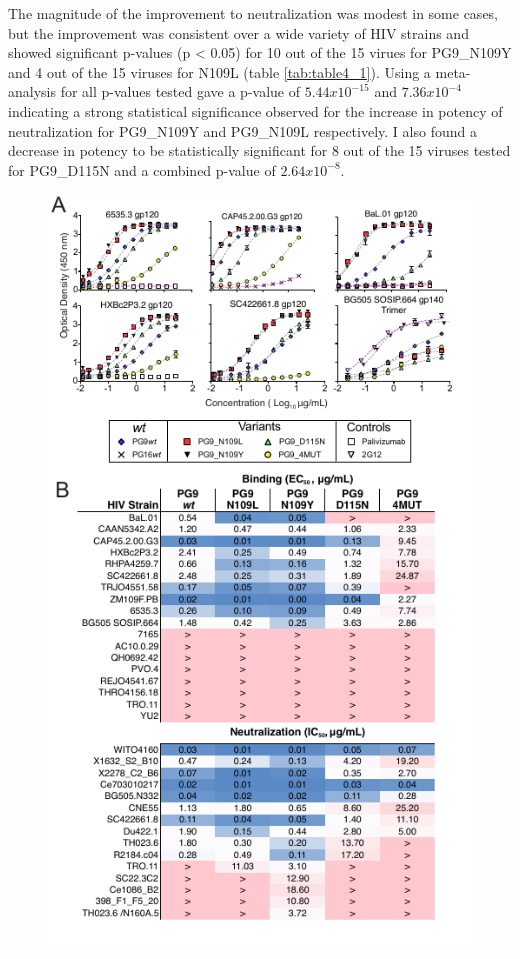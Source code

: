 The magnitude of the improvement to neutralization was modest in some cases, but the improvement was consistent over a wide variety of HIV strains and showed significant p-values (p < 0.05) for 10 out of the 15 virues for PG9\_N109Y and 4 out of the 15 viruses for N109L (table \ref{tab:table4_1}). Using a meta-analysis for all p-values tested gave a p-value of $5.44 x 10^{-15}$ and $7.36 x 10^{-4}$ indicating a strong statistical significance observed for the increase in potency of neutralization for PG9\_N109Y and PG9\_N109L respectively. I also found a decrease in potency to be statistically significant for 8 out of the 15 viruses tested for PG9\_D115N and a combined p-value of $2.64 x 10^{-8}$.


\begin{figure}[!t]
   \centering
   \includegraphics{images/chapter4/figure4_4.pdf} %

\end{figure}
